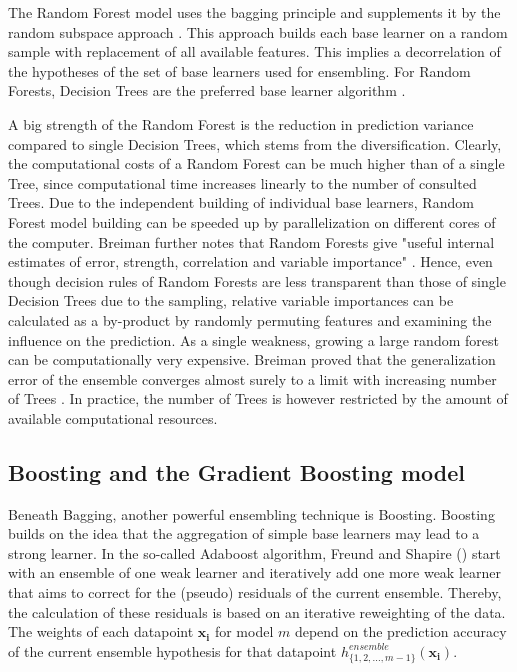 \documentclass[12pt]{article}
\begin{document}
The Random Forest model uses the bagging principle and supplements it by the random subspace approach \citep{ho1998random, breiman2001random}. This approach builds each base learner on a random sample with replacement of all available features. This implies a decorrelation of the hypotheses of the set of base learners used for ensembling. For Random Forests, Decision Trees are the preferred base learner algorithm \citep[cp.][]{breiman2001random}.

A big strength of the Random Forest is the reduction in prediction variance compared to single Decision Trees, which stems from the diversification. Clearly, the computational costs of a Random Forest can be much higher than of a single Tree, since computational time increases linearly to the number of consulted Trees. Due to the independent building of individual base learners, Random Forest model building can be speeded up by parallelization on different cores of the computer. Breiman further notes that Random Forests give "useful internal estimates of error, strength, correlation and variable importance" \citep[p.10]{breiman2001random}. Hence, even though decision rules of Random Forests are less transparent than those of single Decision Trees due to the sampling, relative variable importances can be calculated as a by-product by randomly permuting features and examining the influence on the prediction. As a single weakness, growing a large random forest can be computationally very expensive. Breiman proved that the generalization error of the ensemble converges almost surely to a limit with increasing number of Trees \citep[p.30]{breiman2001random}. In practice, the number of Trees is however restricted by the amount of available computational resources.


\subsection{Boosting and the Gradient Boosting model}
Beneath Bagging, another powerful ensembling technique is Boosting. Boosting builds on the idea that the aggregation of simple base learners may lead to a strong learner. In the so-called Adaboost algorithm, Freund and Shapire (\citeyear{freund1996experiments}) start with an ensemble of one weak learner and iteratively add one more weak learner that aims to correct for the (pseudo) residuals of the current ensemble. Thereby, the calculation of these residuals is based on an iterative reweighting of the data. The weights of each datapoint $\mathbf{x_{i}}$ for model $m$ depend on the prediction accuracy of the current ensemble hypothesis for that datapoint $h^{ensemble}_{\{1,2,...,m-1\}}(\mathbf{x_{i}})$. 
\end{document}
